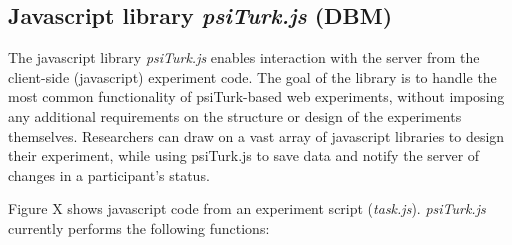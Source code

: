 \documentclass[jou,apacite]{apa6}
\begin{document}
%
%
%
%
%



\subsection{Javascript library \emph{psiTurk.js} (DBM)}

The javascript library \emph{psiTurk.js} enables interaction with the server from the client-side (javascript) experiment code.
The goal of the library is to handle the most common functionality of psiTurk-based web experiments, without imposing any additional requirements on the structure or design of the experiments themselves.
Researchers can draw on a vast array of javascript libraries to design their experiment, while using psiTurk.js to save data and notify the server of changes in a participant's status.

Figure X shows javascript code from an experiment script (\emph{task.js}). 
\emph{psiTurk.js} currently performs the following functions:
\end{document}
